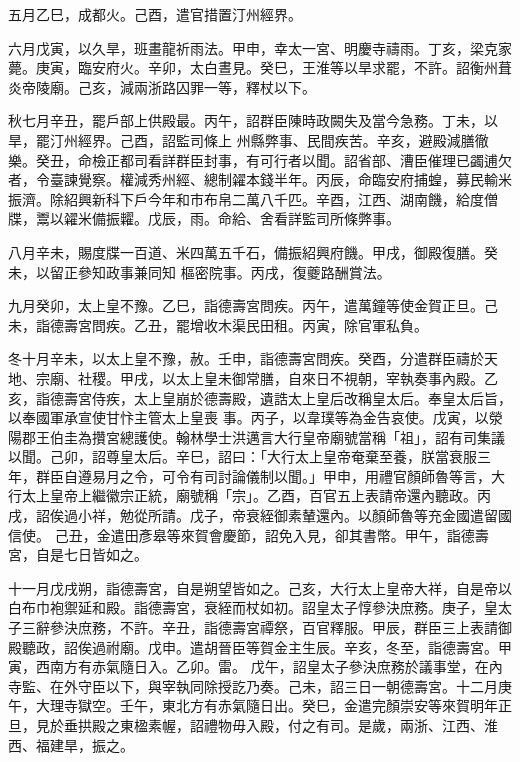 \begin{pinyinscope}
 五月乙巳，成都火。己酉，遣官措置汀州經界。



 六月戊寅，以久旱，班畫龍祈雨法。甲申，幸太一宮、明慶寺禱雨。丁亥，梁克家薨。庚寅，臨安府火。辛卯，太白晝見。癸巳，王淮等以旱求罷，不許。詔衡州葺炎帝陵廟。己亥，減兩浙路囚罪一等，釋杖以下。



 秋七月辛丑，罷戶部上供殿最。丙午，詔群臣陳時政闕失及當今急務。丁未，以旱，罷汀州經界。己酉，詔監司條上
 州縣弊事、民間疾苦。辛亥，避殿減膳徹樂。癸丑，命檢正都司看詳群臣封事，有可行者以聞。詔省部、漕臣催理已蠲逋欠者，令臺諫覺察。權減秀州經、總制糴本錢半年。丙辰，命臨安府捕蝗，募民輸米振濟。除紹興新科下戶今年和市布帛二萬八千匹。辛酉，江西、湖南饑，給度僧牒，鬻以糴米備振糶。戊辰，雨。命給、舍看詳監司所條弊事。



 八月辛未，賜度牒一百道、米四萬五千石，備振紹興府饑。甲戌，御殿復膳。癸未，以留正參知政事兼同知
 樞密院事。丙戌，復夔路酬賞法。



 九月癸卯，太上皇不豫。乙巳，詣德壽宮問疾。丙午，遣萬鐘等使金賀正旦。己未，詣德壽宮問疾。乙丑，罷增收木渠民田租。丙寅，除官軍私負。



 冬十月辛未，以太上皇不豫，赦。壬申，詣德壽宮問疾。癸酉，分遣群臣禱於天地、宗廟、社稷。甲戌，以太上皇未御常膳，自來日不視朝，宰執奏事內殿。乙亥，詣德壽宮侍疾，太上皇崩於德壽殿，遺誥太上皇后改稱皇太后。奉皇太后旨，以奉國軍承宣使甘忭主管太上皇喪
 事。丙子，以韋璞等為金告哀使。戊寅，以滎陽郡王伯圭為攢宮總護使。翰林學士洪邁言大行皇帝廟號當稱「祖」，詔有司集議以聞。己卯，詔尊皇太后。辛巳，詔曰：「大行太上皇帝奄棄至養，朕當衰服三年，群臣自遵易月之令，可令有司討論儀制以聞。」甲申，用禮官顏師魯等言，大行太上皇帝上繼徽宗正統，廟號稱「宗」。乙酉，百官五上表請帝還內聽政。丙戌，詔俟過小祥，勉從所請。戊子，帝衰絰御素輦還內。以顏師魯等充金國遣留國信使。
 己丑，金遣田彥皋等來賀會慶節，詔免入見，卻其書幣。甲午，詣德壽宮，自是七日皆如之。



 十一月戊戌朔，詣德壽宮，自是朔望皆如之。己亥，大行太上皇帝大祥，自是帝以白布巾袍禦延和殿。詣德壽宮，衰絰而杖如初。詔皇太子惇參決庶務。庚子，皇太子三辭參決庶務，不許。辛丑，詣德壽宮禫祭，百官釋服。甲辰，群臣三上表請御殿聽政，詔俟過祔廟。戊申。遣胡晉臣等賀金主生辰。辛亥，冬至，詣德壽宮。甲寅，西南方有赤氣隨日入。乙卯。雷。
 戊午，詔皇太子參決庶務於議事堂，在內寺監、在外守臣以下，與宰執同除授訖乃奏。己未，詔三日一朝德壽宮。十二月庚午，大理寺獄空。壬午，東北方有赤氣隨日出。癸巳，金遣完顏崇安等來賀明年正旦，見於垂拱殿之東楹素幄，詔禮物毋入殿，付之有司。是歲，兩浙、江西、淮西、福建旱，振之。




\end{pinyinscope}
